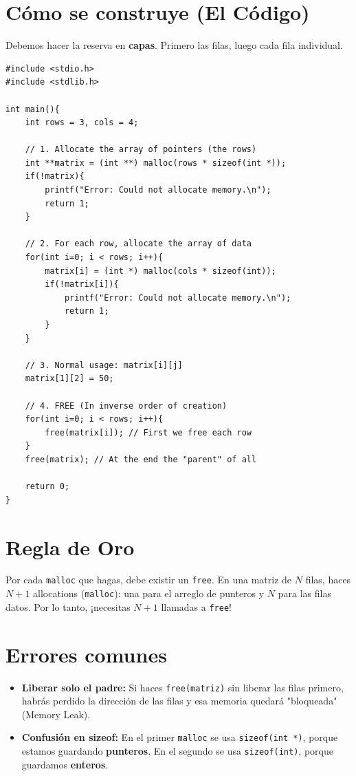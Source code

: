 \documentclass[12pt,a4paper]{article}
\begin{document}
\section{Cómo se construye (El Código)}
Debemos hacer la reserva en \textbf{capas}. Primero las filas, luego cada fila individual.

\begin{lstlisting}
#include <stdio.h>
#include <stdlib.h>

int main(){
    int rows = 3, cols = 4;

    // 1. Allocate the array of pointers (the rows)
    int **matrix = (int **) malloc(rows * sizeof(int *));
    if(!matrix){
        printf("Error: Could not allocate memory.\n");
        return 1;
    }

    // 2. For each row, allocate the array of data
    for(int i=0; i < rows; i++){
        matrix[i] = (int *) malloc(cols * sizeof(int));
        if(!matrix[i]){
            printf("Error: Could not allocate memory.\n");
            return 1;
        }
    }

    // 3. Normal usage: matrix[i][j]
    matrix[1][2] = 50;
    
    // 4. FREE (In inverse order of creation)
    for(int i=0; i < rows; i++){
        free(matrix[i]); // First we free each row
    }
    free(matrix); // At the end the "parent" of all
    
    return 0;
}
\end{lstlisting}

\section{Regla de Oro}
Por cada \texttt{malloc} que hagas, debe existir un \texttt{free}.
En una matriz de $N$ filas, haces $N+1$ allocations (\texttt{malloc}): una para el arreglo de punteros y $N$ para las filas datos. Por lo tanto, ¡necesitas $N+1$ llamadas a \texttt{free}!

\section{Errores comunes}
\begin{itemize}
    \item \textbf{Liberar solo el padre:} Si haces \texttt{free(matriz)} sin liberar las filas primero, habrás perdido la dirección de las filas y esa memoria quedará "bloqueada" (Memory Leak).
    \item \textbf{Confusión en sizeof:} En el primer \texttt{malloc} se usa \texttt{sizeof(int *)}, porque estamos guardando \textbf{punteros}. En el segundo se usa \texttt{sizeof(int)}, porque guardamos \textbf{enteros}.
\end{itemize}
\end{document}
